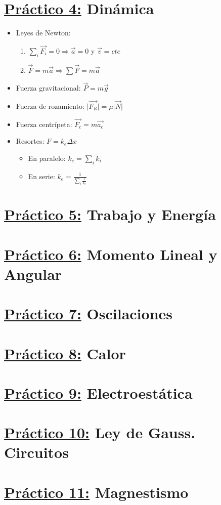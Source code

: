 \documentclass[12pt,a4paper]{article}
\providecommand{\abs}[1]{\lvert#1\rvert}
\begin{document}
	\section*{\underline{Práctico 4:} Dinámica}
		\begin{multicols}{2}
			\begin{itemize}
				\item Leyes de Newton:
				\begin{enumerate}
					\item $\sum_{i} \vec{F_{i}} = 0 \Rightarrow \vec{a} = 0$ y $\vec{v} = cte$
					\item $\vec{F} = m \vec{a} \Rightarrow \sum \vec{F} = m \vec{a}$
				\end{enumerate}
				\item Fuerza gravitacional: $\vec{P} = m \vec{g}$
				\item Fuerza de rozamiento: $\abs{\vec{F_{R}}} = \mu \abs{\vec{N}}$
				\item Fuerza centrípeta: $\vec{F_{c}} = m \vec{a_{c}}$
				\item Resortes: $F = k_{e} \Delta x$
				\begin{itemize}
					\item En paralelo: $k_{e} = \sum_{i} k_{i}$
					\item En serie: $k_{e} = \frac{1}{\sum_{i} \frac{1}{k_{e}}}$
				\end{itemize}
			\end{itemize}
		\end{multicols}
		
	\section*{\underline{Práctico 5:} Trabajo y Energía}
	\section*{\underline{Práctico 6:} Momento Lineal y Angular}
	\section*{\underline{Práctico 7:} Oscilaciones}
	\section*{\underline{Práctico 8:} Calor}
	\section*{\underline{Práctico 9:} Electroestática}
	\section*{\underline{Práctico 10:} Ley de Gauss. Circuitos}
	\section*{\underline{Práctico 11:} Magnestismo}
\end{document}
